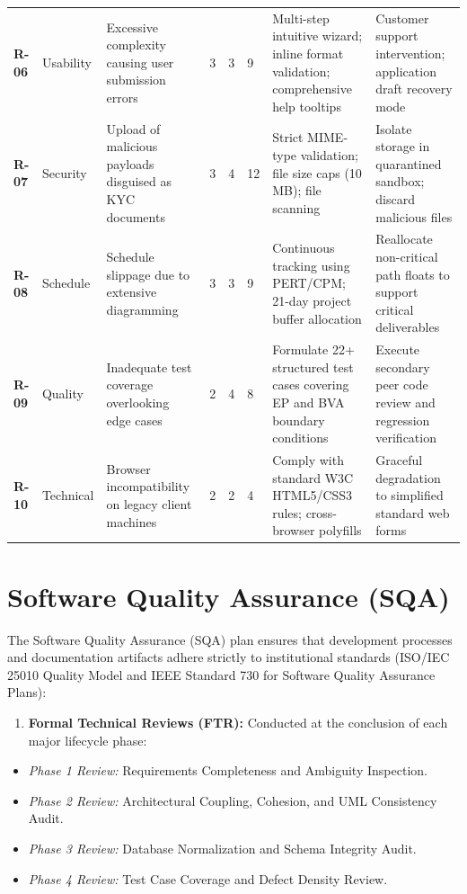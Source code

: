 \begin{table}[htbp]
{\begin{tabular}{l l l l l l l l}
\textbf{R-06} & Usability & Excessive complexity causing user submission errors & 3 & 3 & 9 & Multi-step intuitive wizard; inline format validation; comprehensive help tooltips & Customer support intervention; application draft recovery mode \\
\textbf{R-07} & Security & Upload of malicious payloads disguised as KYC documents & 3 & 4 & 12 & Strict MIME-type validation; file size caps (10 MB); file scanning & Isolate storage in quarantined sandbox; discard malicious files \\
\textbf{R-08} & Schedule & Schedule slippage due to extensive diagramming & 3 & 3 & 9 & Continuous tracking using PERT/CPM; 21-day project buffer allocation & Reallocate non-critical path floats to support critical deliverables \\
\textbf{R-09} & Quality & Inadequate test coverage overlooking edge cases & 2 & 4 & 8 & Formulate 22+ structured test cases covering EP and BVA boundary conditions & Execute secondary peer code review and regression verification \\
\textbf{R-10} & Technical & Browser incompatibility on legacy client machines & 2 & 2 & 4 & Comply with standard W3C HTML5/CSS3 rules; cross-browser polyfills & Graceful degradation to simplified standard web forms \\
\bottomrule
\end{tabular}%
}
\end{table}

\section{Software Quality Assurance (SQA)}

The Software Quality Assurance (SQA) plan ensures that development processes and documentation artifacts adhere strictly to institutional standards (ISO/IEC 25010 Quality Model and IEEE Standard 730 for Software Quality Assurance Plans):

\begin{enumerate}
  \item \textbf{Formal Technical Reviews (FTR):} Conducted at the conclusion of each major lifecycle phase:
\end{enumerate}

\begin{itemize}
  \item \textit{Phase 1 Review:} Requirements Completeness and Ambiguity Inspection.
  \item \textit{Phase 2 Review:} Architectural Coupling, Cohesion, and UML Consistency Audit.
  \item \textit{Phase 3 Review:} Database Normalization and Schema Integrity Audit.
  \item \textit{Phase 4 Review:} Test Case Coverage and Defect Density Review.
\end{itemize}

